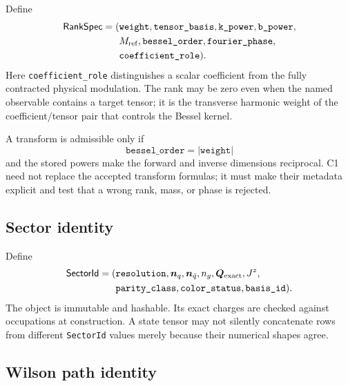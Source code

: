 \documentclass[11pt]{article}
\begin{document}
Define
\begin{equation}
\begin{aligned}
 \mathsf{RankSpec}=(&\texttt{weight},\texttt{tensor\_basis},
 \texttt{k\_power},\texttt{b\_power},\\
 &M_{\rm ref},\texttt{bessel\_order},
 \texttt{fourier\_phase},\\
 &\texttt{coefficient\_role}).
\end{aligned}
\label{eq:rank-software-spec}
\end{equation}
Here \texttt{coefficient\_role} distinguishes a scalar coefficient from the
fully contracted physical modulation.  The rank may be zero even when the
named observable contains a target tensor; it is the transverse harmonic
weight of the coefficient/tensor pair that controls the Bessel kernel.

A transform is admissible only if
\begin{equation}
 \texttt{bessel\_order}=|\texttt{weight}|
\label{eq:bessel-rank-condition}
\end{equation}
and the stored powers make the forward and inverse dimensions reciprocal.
C1 need not replace the accepted transform formulas; it must make their
metadata explicit and test that a wrong rank, mass, or phase is rejected.

\subsection{Sector identity}

Define
\begin{equation}
\begin{aligned}
 \mathsf{SectorId}=(&\texttt{resolution},\bm n_q,\bm n_{\bar q},n_g,
 \bm Q_{\rm exact},J^z,\\
 &\texttt{parity\_class},\texttt{color\_status},
 \texttt{basis\_id}).
\end{aligned}
\label{eq:sector-id}
\end{equation}
The object is immutable and hashable.  Its exact charges are checked against
occupations at construction.  A state tensor may not silently concatenate
rows from different \texttt{SectorId} values merely because their numerical
shapes agree.

\subsection{Wilson path identity}
\end{document}
